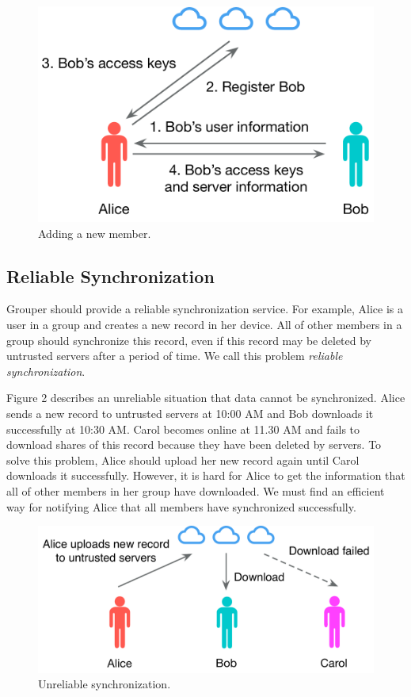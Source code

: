 \documentclass[twocolumn,10pt]{article}
\begin{document}
\begin{figure}[t]
	\centering
	\includegraphics[scale=0.38]{add_member}
	\caption{Adding a new member.}
\end{figure}

\subsection{Reliable Synchronization}
Grouper should provide a reliable synchronization service. For example, Alice is a user in a group and creates a new record in her device. All of other members in a group should synchronize this record, even if this record may be deleted by untrusted servers after a period of time. We call this problem \emph{reliable synchronization}.

Figure 2 describes an unreliable situation that data cannot be synchronized. Alice sends a new record to untrusted servers at 10:00 AM and Bob downloads it successfully at 10:30 AM. Carol becomes online at 11.30 AM and fails to download shares of this record because they have been deleted by servers. To solve this problem, Alice should upload her new record again until Carol downloads it successfully. However, it is hard for Alice to get the information that all of other members in her group have downloaded. We must find an efficient way for notifying Alice that all members have synchronized successfully.

\begin{figure}[t]
	\centering
	\includegraphics[scale=0.38]{unreliabe_sync}
	\caption{Unreliable synchronization.}
\end{figure}
\end{document}

